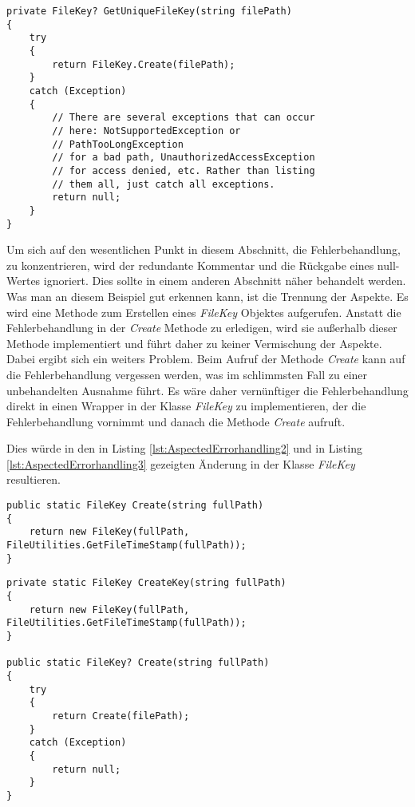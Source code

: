\begin{lstlisting}[language={[Sharp]C}, caption=Beispiele für getrennten Aspket der Fehlerbehandlung, label=lst:AspectedErrorhandling1]
private FileKey? GetUniqueFileKey(string filePath)
{
	try
	{
		return FileKey.Create(filePath);
	}
	catch (Exception)
	{
		// There are several exceptions that can occur 
		// here: NotSupportedException or 
		// PathTooLongException
		// for a bad path, UnauthorizedAccessException 
		// for access denied, etc. Rather than listing
		// them all, just catch all exceptions.
		return null;
	}
}
\end{lstlisting}

\SuperPar Um sich auf den wesentlichen Punkt in diesem Abschnitt, die Fehlerbehandlung, zu konzentrieren, wird der redundante Kommentar und die Rückgabe eines null-Wertes ignoriert. Dies sollte in einem anderen Abschnitt näher behandelt werden. %
Was man an diesem Beispiel gut erkennen kann, ist die Trennung der Aspekte. Es wird eine Methode zum Erstellen eines \textit{FileKey} Objektes aufgerufen. Anstatt die Fehlerbehandlung in der \textit{Create} Methode zu erledigen, wird sie außerhalb dieser Methode implementiert und führt daher zu keiner Vermischung der Aspekte. Dabei ergibt sich ein weiters Problem. Beim Aufruf der Methode \textit{Create} kann auf die Fehlerbehandlung vergessen werden, was im schlimmsten Fall zu einer unbehandelten Ausnahme führt. Es wäre daher vernünftiger die Fehlerbehandlung direkt in einen Wrapper in der Klasse \textit{FileKey} zu implementieren, der die Fehlerbehandlung vornimmt und danach die Methode \textit{Create} aufruft.

\SuperPar Dies würde in den in Listing \ref{lst:AspectedErrorhandling2} und in Listing \ref{lst:AspectedErrorhandling3} gezeigten Änderung in der Klasse \textit{FileKey} resultieren.

\begin{lstlisting}[language={[Sharp]C}, caption=Fehlerbehandlung in der Klasse FileKey vorher, label=lst:AspectedErrorhandling2]
public static FileKey Create(string fullPath)
{
	return new FileKey(fullPath, FileUtilities.GetFileTimeStamp(fullPath));
}
\end{lstlisting}

\begin{lstlisting}[language={[Sharp]C}, caption=Fehlerbehandlung in der Klasse FileKey nachher, label=lst:AspectedErrorhandling3]
private static FileKey CreateKey(string fullPath)
{
	return new FileKey(fullPath, FileUtilities.GetFileTimeStamp(fullPath));
}
				
public static FileKey? Create(string fullPath)
{
	try
	{
		return Create(filePath);
	}
	catch (Exception)
	{
		return null;
	}
}
\end{lstlisting}

